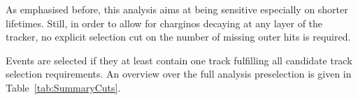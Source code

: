 As emphasised before, this analysis aims at being sensitive especially on shorter lifetimes.
Still, in order to allow for charginos decaying at any layer of the tracker, no explicit selection cut on the number of missing outer hits is required.

Events are selected if they at least contain one track fulfilling all candidate track selection requirements.
An overview over the full analysis preselection is given in Table~\ref{tab:SummaryCuts}. 
\renewcommand{\arraystretch}{1.39}
\begin{table}[!h]
\centering
\caption{Summary and categorisation of the analysis selection.}
\label{tab:SummaryCuts}
\end{table}
